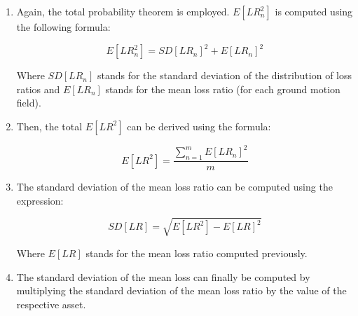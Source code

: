 \begin{enumerate}

\item Again, the total probability theorem is employed. $E[LR_n^2]$ is computed using the following formula:

\begin{equation}
E[LR_n^2]=SD[LR_n]^2+E[LR_n]^2
\end{equation}

Where $SD[LR_n]$ stands for the standard deviation of the distribution of loss ratios and $E[LR_n]$ stands for the mean loss ratio (for each ground motion field).

\item Then, the total $E[LR^2]$ can be derived using the formula:

\begin{equation}
E[LR^2]=\frac{\sum_{n=1}^m E[LR_n]^2}{m}
\end{equation}

\item The standard deviation of the mean loss ratio can be computed using the expression:

\begin{equation}
SD[LR]=\sqrt{E[LR^2]-E[LR]^2}
\end{equation}

Where $E[LR]$ stands for the mean loss ratio computed previously.

\item The standard deviation of the mean loss can finally be computed by multiplying the standard deviation of the mean loss ratio by the value of the respective asset.

\end{enumerate}

